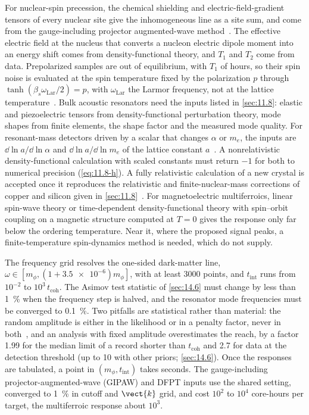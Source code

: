 For nuclear-spin precession, the chemical shielding and electric-field-gradient tensors of every nuclear site give the inhomogeneous line as a site sum, and come from the gauge-including projector augmented-wave method~\cite{pickard2001all}. The effective electric field at the nucleus that converts a nucleon electric dipole moment into an energy shift comes from density-functional theory, and $T_1$ and $T_2$ come from data. Prepolarized samples are out of equilibrium, with $T_1$ of hours, so their spin noise is evaluated at the spin temperature fixed by the polarization $p$ through $\tanh(\beta_s\omega_{\mathrm{Lar}}/2) = p$, with $\omega_{\mathrm{Lar}}$ the Larmor frequency, not at the lattice temperature~\cite{budker2014proposal}. Bulk acoustic resonators need the inputs listed in \cref{sec:11.8}: elastic and piezoelectric tensors from density-functional perturbation theory, mode shapes from finite elements, the shape factor and the measured mode quality. For resonant-mass detectors driven by a scalar that changes $\alpha$ or $m_e$, the inputs are $\dd\ln a/\dd\ln\alpha$ and $\dd\ln a/\dd\ln m_e$ of the lattice constant $a$~\cite{arvanitaki2016sound}. A nonrelativistic density-functional calculation with scaled constants must return $-1$ for both to numerical precision (\cref{eq:11.8-h}). A fully relativistic calculation of a new crystal is accepted once it reproduces the relativistic and finite-nuclear-mass corrections of copper and silicon given in \cref{sec:11.8}~\cite[Table~II]{pasteka2019material}. For magnetoelectric multiferroics, linear spin-wave theory or time-dependent density-functional theory with spin--orbit coupling on a magnetic structure computed at $T = 0$ gives the response only far below the ordering temperature. Near it, where the proposed signal peaks, a finite-temperature spin-dynamics method is needed, which  do not supply.

The frequency grid resolves the one-sided dark-matter line, $\omega \in [m_\phi, (1 + \num{3.5e-6})m_\phi]$, with at least 3000 points, and $t_{\mathrm{int}}$ runs from $10^{-2}$ to $10^3\,t_{\mathrm{coh}}$. The Asimov test statistic of \cref{sec:14.6} must change by less than \SI{1}{\percent} when the frequency step is halved, and the resonator mode frequencies must be converged to \SI{0.1}{\percent}. Two pitfalls are statistical rather than material: the random amplitude is either in the likelihood or in a penalty factor, never in both~\cite{centers2021stochastic}, and an analysis with fixed amplitude overestimates the reach, by a factor 1.99 for the median limit of a record shorter than $t_{\mathrm{coh}}$ and 2.7 for data at the detection threshold (up to 10 with other priors; \cref{sec:14.6}). Once the responses are tabulated, a point in $(m_\phi, t_{\mathrm{int}})$ takes seconds. The gauge-including projector-augmented-wave (GIPAW) and DFPT inputs use the shared setting, converged to \SI{1}{\percent} in cutoff and $\vect{k}$ grid, and cost $10^{2}$ to $10^{4}$ core-hours per target, the multiferroic response about $10^{3}$.

